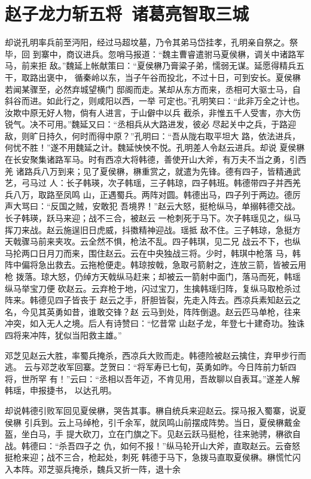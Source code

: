 \chapter{赵子龙力斩五将~诸葛亮智取三城}

却说孔明率兵前至沔阳，经过马超坟墓，乃令其弟马岱挂孝，孔明亲自祭之。祭毕，回
到寨中，商议进兵。忽哨马报道：“魏主曹睿遣驸马夏侯楙，调关中诸路军马，前来拒
敌。”魏延上帐献策曰：“夏侯楙乃膏粱子弟，懦弱无谋。延愿得精兵五干，取路出褒中，
循秦岭以东，当子午谷而投北，不过十日，可到安长。夏侯楙若闻某骤至，必然弃城望横门
邸阁而走。某却从东方而来，丞相可大驱士马，自斜谷而进。如此行之，则咸阳以西，一举
可定也。”孔明笑曰：“此非万全之计也。汝欺中原无好人物，倘有人进言，于山僻中以兵
截杀，非惟五千人受害，亦大伤锐气。决不可用。”魏延又曰：“丞相兵从大路进发，彼必
尽起关中之兵，于路迎敌，则旷日持久，何时而得中原？”孔明曰：“吾从陇右取平坦大
路，依法进兵，何忧不胜！”遂不用魏延之计。魏延怏怏不悦。孔明差人令赵云进兵。却说
夏侯楙在长安聚集诸路军马。时有西凉大将韩德，善使开山大斧，有万夫不当之勇，引西羌
诸路兵八万到来；见了夏侯楙，楙重赏之，就遣为先锋。德有四子，皆精通武艺，弓马过
人：长子韩瑛，次子韩瑶，三子韩琼，四子韩班。韩德带四子并西羌兵八万，取路至凤鸣
山，正遇蜀兵。两阵对圆。韩德出马，四子列于两边。德厉声大骂曰：“反国之贼，安敢犯
吾境界！”赵云大怒，挺枪纵马，单搦韩德交战。长子韩瑛，跃马来迎；战不三合，被赵云
一枪刺死于马下。次子韩瑶见之，纵马挥刀来战。赵云施逞旧日虎威，抖擞精神迎战。瑶抵
敌不住。三子韩琼，急挺方天戟骤马前来夹攻。云全然不惧，枪法不乱。四子韩琪，见二兄
战云不下，也纵马抡两口日月刀而来，围住赵云。云在中央独战三将。少时，韩琪中枪落
马，韩阵中偏将急出救去。云拖枪便走。韩琼按戟，急取弓箭射之，连放三箭，皆被云用枪
拨落。琼大怒，仍绰方天戟纵马赶来；却被云一箭射中面门，落马而死，韩瑶纵马举宝刀便
砍赵云。云弃枪于地，闪过宝刀，生擒韩瑶归阵，复纵马取枪杀过阵来。韩德见四子皆丧于
赵云之手，肝胆皆裂，先走入阵去。西凉兵素知赵云之名，今见其英勇如昔，谁敢交锋？赵
云马到处，阵阵倒退。赵云匹马单枪，往来冲突，如入无人之境。后人有诗赞曰：“忆昔常
山赵子龙，年登七十建奇功。独诛四将来冲阵，犹似当阳救主雄。”

邓芝见赵云大胜，率蜀兵掩杀，西凉兵大败而走。韩德险被赵云擒住，弃甲步行而逃。
云与邓芝收军回寨。芝贺曰：“将军寿已七旬，英勇如昨。今日阵前力斩四将，世所罕
有！”云曰：“丞相以吾年迈，不肯见用，吾故聊以自表耳。”遂差人解韩瑶，申报捷书，
以达孔明。

却说韩德引败军回见夏侯楙，哭告其事。楙自统兵来迎赵云。探马报入蜀寨，说夏侯楙
引兵到。云上马绰枪，引千余军，就凤鸣山前摆成阵势。当日，夏侯楙戴金盔，坐白马，手
提大砍刀，立在门旗之下。见赵云跃马挺枪，往来驰骋，楙欲自战。韩德曰：“杀吾四子之
仇，如何不报！”纵马轮开山大斧，直取赵云。云奋怒挺枪来迎；战不三合，枪起处，刺死
韩德于马下，急拨马直取夏侯楙。楙慌忙闪入本阵。邓芝驱兵掩杀，魏兵又折一阵，退十余

